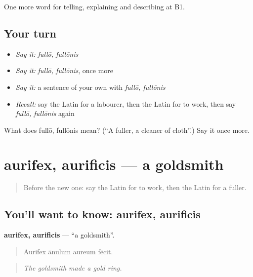 \begin{grammarlens}[title={What you've built}]
One more word for telling, explaining and describing at B1.
\end{grammarlens}

\subsection*{Your turn}
\begin{itemize}
\raggedright
  \item \emph{Say it:} \emph{fullō, fullōnis}
  \item \emph{Say it:} \emph{fullō, fullōnis}, once more
  \item \emph{Say it:} a sentence of your own with \emph{fullō, fullōnis}
  \item \emph{Recall:} say the Latin for a labourer, then the Latin for to work, then say \emph{fullō, fullōnis} again
\end{itemize}

\begin{tcolorbox}[breakable,colback=teal!4,colframe=teal!35!black,title={Before you move on}]
What does fullō, fullōnis mean? (\textquotedblleft{}A fuller, a cleaner of cloth\textquotedblright{}.) Say it once more.
\end{tcolorbox}
\section[aurifex, aurificis]{aurifex, aurificis — a goldsmith}

\label{lesson:LA-C377-aurifex}



\begin{quote}
Before the new one: say the Latin for to work, then the Latin for a fuller.
\end{quote}

\subsection*{You'll want to know: aurifex, aurificis}
\textbf{aurifex, aurificis} — \textquotedblleft{}a goldsmith\textquotedblright{}.

\begin{quote}
Aurifex ānulum aureum fēcit.
\end{quote}

\begin{quote}
\emph{The goldsmith made a gold ring.}
\end{quote}

